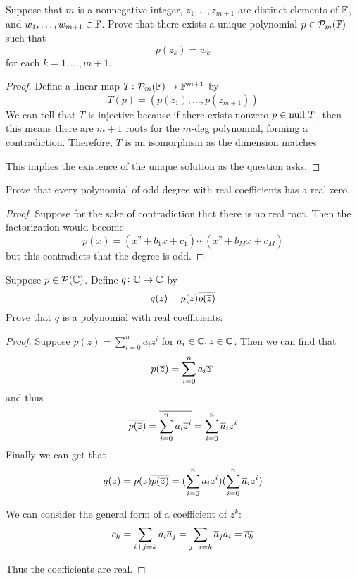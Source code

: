 \documentclass{extarticle}
\begin{document}
\begin{problem}{7}
    Suppose that \(m\) is a nonnegative integer, \(z_1, \ldots, z_{m+1}\) are distinct elements 
    of \(\mathbb{F}\), and \(w_1, \ldots, w_{m+1} \in \mathbb{F}\). Prove that there exists a unique polynomial 
    \(p \in \mathcal{P}_m(\mathbb{F})\) such that 
    \[p(z_k) = w_k\]
    for each \(k = 1, \ldots, m+1\). 
\end{problem}

\begin{proof}
Define a linear map \(T \colon \mathcal{P}_m(\mathbb{F}) \to \mathbb{F}^{m+1}\) by 
\[T(p) = (p(z_1), \ldots, p(z_{m+1}))\]
We can tell that \(T\) is injective because if there exists nonzero \(p \in \text{null } T\), then 
this means there are \(m+1\) roots for the \(m\)-deg polynomial, forming a contradiction. Therefore, 
\(T\) is an isomorphism as the dimension matches. 

This implies the existence of the unique solution as the question asks. 
\end{proof}

\begin{problem}{9}
    Prove that every polynomial of odd degree with real coefficients has a real zero.
\end{problem}

\begin{proof}
Suppose for the sake of contradiction that there is no real root. Then the factorization would become 
\[p(x) = (x^2 + b_1x + c_1) \cdots (x^2 + b_Mx + c_M)\]
but this contradicts that the degree is odd. 
\end{proof}

\begin{problem}{11}
    Suppose \(p \in \mathcal{P}(\mathbb{C})\). Define \(q \colon \mathbb{C} \to \mathbb{C}\) by 
    \[q(z) = p(z) \overline{p(\overline{z})}\]
    Prove that \(q\) is a polynomial with real coefficients. 
\end{problem}

\begin{proof}
Suppose \(p(z) = \sum_{i=0}^{n} a_i z^i\) for \(a_i \in \mathbb{C}, z \in \mathbb{C}\). Then we can find that 
\[p(\overline{z}) = \sum_{i=0}^{n}a_i \overline{z}^i\]
and thus  
\[\overline{p(\overline{z})} = \overline{\sum_{i=0}^{n}a_i \overline{z}^i}
= \sum_{i=0}^{n} \overline{a}_i z^i\]
Finally we can get that 
\[q(z) = p(z)\overline{p(\overline{z})} 
= (\sum_{i=0}^{n}a_i z^i)(\sum_{i=0}^{n}\overline{a}_i z^i)\]

We can consider the general form of a coefficient of \(z^k\):
\[c_k = \sum_{i+j=k} a_i \overline{a}_j = \sum_{j+i=k} \overline{a}_j a_i = \overline{c_k}\]

Thus the coefficients are real.


\end{proof}
\end{document}
